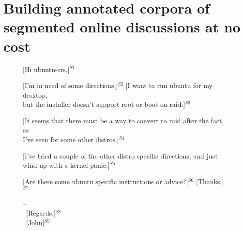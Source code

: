 
\section{Building annotated corpora of segmented online discussions at no cost}
\label{}

\begin{figure}
%
\small
[Hi ubuntu-ers,]$^{S1}$\vspace{0.1cm}

[I'm in need of some directions.]$^{S2}$ [I want to run ubuntu for my desktop,\\
but the installer doesn't support root or boot on raid.]$^{S3}$  \vspace{0.1cm}

[It seems that there must be a way to convert to raid after the fact, as\\
I've seen for some other distros.]$^{S4}$\vspace{0.1cm}

[I've tried a couple of the other distro specific directions, and just\\
wind up with a kernel panic.]$^{S5}$  \vspace{0.1cm}

[Are there some ubuntu specific instructions or advice?]$^{S6}$  [Thanks.]$^{S7}$\vspace{0.1cm}

-- \\ \ 
[Regards,]$^{S8}$ \\ \ 
[John]$^{S9}$
\caption{}
\label{}
\end{figure}

